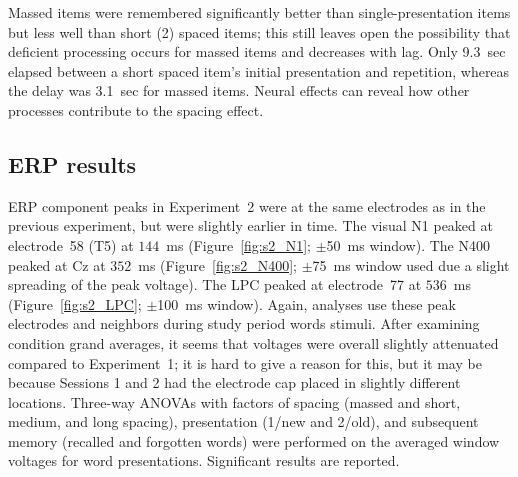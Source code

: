 Massed items were remembered significantly better than single-presentation items but less well than short (2) spaced items; this still leaves open the possibility that deficient processing occurs for massed items and decreases with lag.  Only 9.3~sec elapsed between a short spaced item's initial presentation and repetition, whereas the delay was 3.1~sec for massed items.  Neural effects can reveal how other processes contribute to the spacing effect.

\subsection{ERP results}

ERP component peaks in Experiment~2 were at the same electrodes as in the previous experiment, but were slightly earlier in time.
The visual N1 peaked at electrode~58 (T5) at $144$~ms (Figure~\ref{fig:s2_N1}; $\pm$50~ms window).  The N400 peaked at Cz at $352$~ms (Figure~\ref{fig:s2_N400}; $\pm$75~ms window used due a slight spreading of the peak voltage).  The LPC peaked at electrode~77 at $536$~ms (Figure~\ref{fig:s2_LPC}; $\pm$100~ms window).  Again, analyses use these peak electrodes and neighbors during study period words stimuli.  After examining condition grand averages, it seems that voltages were overall slightly attenuated compared to Experiment~1; it is hard to give a reason for this, but it may be because Sessions 1 and 2 had the electrode cap placed in slightly different locations.
Three-way ANOVAs with factors of spacing (massed and short, medium, and long spacing), presentation (1/new and 2/old), and subsequent memory (recalled and forgotten words) were performed on the averaged window voltages for word presentations.  Significant results are reported.


